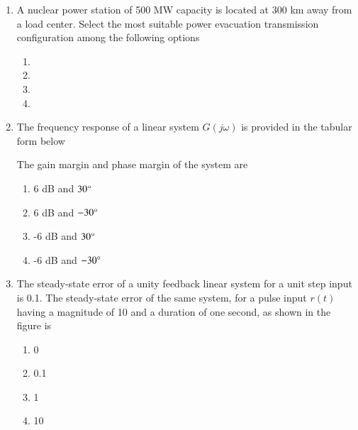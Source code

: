 \documentclass[journal,9pt,onecolumn]{IEEEtran}
\begin{document}
\begin{enumerate}
\item A nuclear power station of 500 MW capacity is located at 300 km away from a load center. Select the most suitable power evacuation transmission configuration among the following options
    \begin{enumerate}
        \item 
        \item 
        \item 
        \item 
    \end{enumerate}

\item The frequency response of a linear system $G(j \omega)$ is provided in the tabular form below
\begin{center}
\begin{table}[h!]
    \centering
    
    \label{tab:EE-2011}
\end{table}
\end{center}
The gain margin and phase margin of the system are
\begin{multicols}{4}
    \begin{enumerate}
        \item 6 dB and $30\degree$
        \item 6 dB and $-30\degree$
        \item -6 dB and $30\degree$
        \item -6 dB and $-30\degree$
    \end{enumerate}
\end{multicols}

\item The steady-state error of a unity feedback linear system for a unit step input is 0.1. The steady-state error of the same system, for a pulse input $r(t)$ having a magnitude of 10 and a duration of one second, as shown in the figure is
\begin{center}
    
\end{center}
\begin{multicols}{2}
    \begin{enumerate}
        \item 0
        \item 0.1
        \item 1
        \item 10
    \end{enumerate}
\end{multicols}


\end{enumerate}
\end{document}
